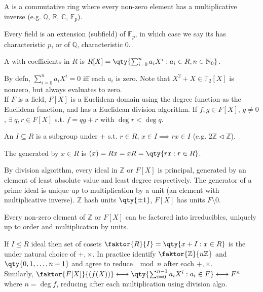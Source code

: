 \begin{definition}[Field]
    A  is a commutative ring where every non-zero element has a multiplicative inverse (e.g. $\mathbb{Q}$, $\mathbb{R}$, $\mathbb{C}$, $\mathbb{F}_p$).
\end{definition}

Every field is an extension (subfield) of $\mathbb{F}_p$, in which case we say its has characteristic $p$, or of $\mathbb{Q}$, characteristic 0.

\begin{definition}
    A  with coefficients in $R$ is $R[X] = \qty{\sum_{i=0}^{n} a_i X^i : a_i \in R, n \in \mathbb{N}_0}$.
\end{definition}

By defn, $\sum_{i=0}^n a_i X^i = 0$ iff each $a_i$ is zero.
Note that $X^2 + X \in \mathbb F_2[X]$ is nonzero, but always evaluates to zero. \\
If $F$ is a field, $F[X]$ is a Euclidean domain using the degree function as the Euclidean function, and has a Euclidean division algorithm.
If $f, g \in F[X]$, $g \neq 0$, $\exists \; q, r \in F[X]$ s.t. $f = qg + r$ with $\deg r < \deg q$.

\begin{definition}[Ideal]
    An  $I \subseteq R$ is a subgroup under $+$ s.t. $r \in R$, $x \in I \implies rx \in I$ (e.g. $2 \mathbb{Z} \triangleleft \mathbb{Z}$).
\end{definition}

\begin{definition}
    The  generated by $x \in R$ is $(x) = Rx = xR = \qty{rx : r \in R}$.
\end{definition}

By division algorithm, every ideal in $\mathbb{Z}$ or $F[X]$ is principal, generated by an element of least absolute value and least degree respectively.
The generator of a prime ideal is unique up to multiplication by a unit (an element with multiplicative inverse).
$\mathbb{Z}$ hash units $\qty{\pm 1}$, $F[X]$ has units $F \setminus \qty{0}$.

Every non-zero element of $\mathbb{Z}$ or $F[X]$ can be factored into irreducibles, uniquely up to order and multiplication by units.

If $I \trianglelefteq R$ ideal then set of cosets $\faktor{R}{I} = \qty{x + I : x \in R}$ is the  under natural choice of $+, \times$.
In practice identify $\faktor{\mathbb{Z}}{n \mathbb{Z}}$ and $\qty{0, 1, \dots, n-1}$ and agree to reduce $\mod n$ after each $+, \times$. \\
Similarly, $\faktor{F[X]}{(f(X))} \longleftrightarrow \qty{\sum_{i=0}^{n-1} a_i X^i : a_i \in F} \longleftrightarrow F^n$ where $n = \deg f$, reducing after each multiplication using division algo.

